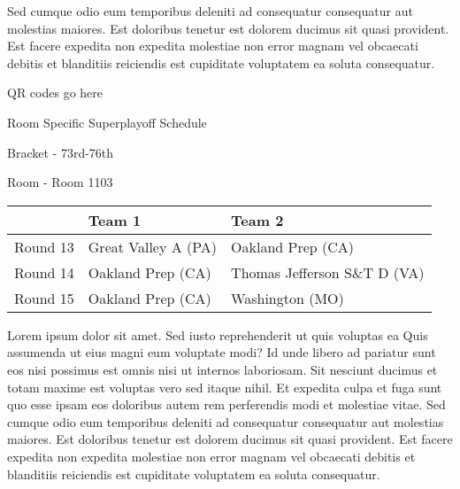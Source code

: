 \documentclass{article}%
\begin{document}
Sed cumque odio eum temporibus deleniti ad consequatur consequatur aut molestias maiores. Est doloribus tenetur est dolorem ducimus sit quasi provident. Est facere expedita non expedita molestiae non error magnam vel obcaecati debitis et blanditiis reiciendis est cupiditate voluptatem ea soluta consequatur.%
\vspace*{140pt}%
\begin{center}%
\begin{Huge}%
QR codes go here%
\end{Huge}%
\end{center}%
\newpage%
\begin{center}%
\begin{Huge}%
Room Specific Superplayoff Schedule%
\end{Huge}%
\vspace*{8pt}%
\linebreak%
\begin{Large}%
Bracket {-} 73rd{-}76th%
\end{Large}%
\vspace*{8pt}%
\linebreak%
\vspace*{8pt}%
\begin{Large}%
Room {-} Room 1103%
\end{Large}%
\end{center}%
%
\begin{tabularx}{\textwidth}{|c|Y|Y|}%
\hline%
&Team 1&Team 2\\%
\hline%
Round 13&Great Valley A (PA)&Oakland Prep (CA)\\%
Round 14&Oakland Prep (CA)&Thomas Jefferson S\&T D (VA)\\%
Round 15&Oakland Prep (CA)&Washington (MO)\\%
\hline%
\end{tabularx}%
\vspace*{8pt}%
\newline%
Lorem ipsum dolor sit amet. Sed iusto reprehenderit ut quis voluptas ea Quis assumenda ut eius magni eum voluptate modi? Id unde libero ad pariatur sunt eos nisi possimus est omnis nisi ut internos laboriosam. Sit nesciunt ducimus et totam maxime est voluptas vero sed itaque nihil. Et expedita culpa et fuga sunt quo esse ipsam eos doloribus autem rem perferendis modi et molestiae vitae.\newline%
\newline%
Sed cumque odio eum temporibus deleniti ad consequatur consequatur aut molestias maiores. Est doloribus tenetur est dolorem ducimus sit quasi provident. Est facere expedita non expedita molestiae non error magnam vel obcaecati debitis et blanditiis reiciendis est cupiditate voluptatem ea soluta consequatur.%
\end{document}
